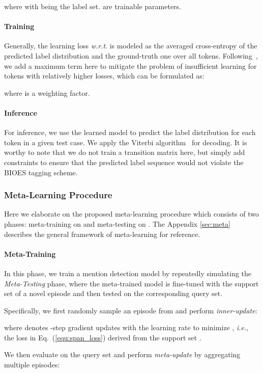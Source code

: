 \documentclass[11pt]{article}
\newcommand\ie{\textit{i.e.}}
\newcommand\wrt{\textit{w.r.t}}
\begin{document}
where  with  being the label set.  are trainable parameters.


\paragraph{Training} Generally, the learning loss \wrt.  is modeled as the averaged cross-entropy of the predicted label distribution and the ground-truth one over all tokens.
Following~\citet{wu2020enhanced}, we add a maximum term here to mitigate the problem of insufficient learning for tokens with relatively higher losses, which can be formulated as:

where  is a weighting factor.

\paragraph{Inference} For inference, we use the learned model to predict the label distribution for each token in a given test case.
We apply the Viterbi algorithm~\citep{forney1973viterbi} for decoding.
It is worthy to note that we do not train a transition matrix here, but simply add constraints to ensure that the predicted label sequence would not violate the BIOES tagging scheme.


\subsubsection{Meta-Learning Procedure}
\label{sec:span_meta}
Here we elaborate on the proposed meta-learning procedure which consists of two phases: meta-training on  and meta-testing on .
The Appendix \ref{sec:meta} describes the general framework of meta-learning for reference.

\paragraph{Meta-Training} In this phase, we train a mention detection model  by repeatedly simulating the \textit{Meta-Testing} phase, where the meta-trained model is fine-tuned with the support set of a novel episode and then tested on the corresponding query set.

Specifically, we first randomly sample an episode  from  and perform \textit{inner-update}:

where  denotes -step gradient updates with the learning rate  to minimize , \ie, the loss in Eq.~(\ref{equ:span_loss}) derived from the support set .

We then evaluate  on the query set  and perform \textit{meta-update} by aggregating multiple episodes:
\end{document}
